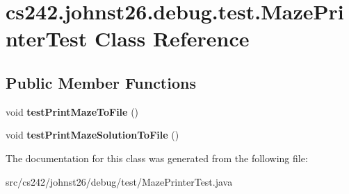 \hypertarget{classcs242_1_1johnst26_1_1debug_1_1test_1_1_maze_printer_test}{\section{cs242.\-johnst26.\-debug.\-test.\-Maze\-Printer\-Test Class Reference}
\label{classcs242_1_1johnst26_1_1debug_1_1test_1_1_maze_printer_test}
}
\subsection*{Public Member Functions}
\begin{DoxyCompactItemize}
\item 
\hypertarget{classcs242_1_1johnst26_1_1debug_1_1test_1_1_maze_printer_test_a6f31e0ef7e7282b110a0682f29760145}{void {\bfseries test\-Print\-Maze\-To\-File} ()}\label{classcs242_1_1johnst26_1_1debug_1_1test_1_1_maze_printer_test_a6f31e0ef7e7282b110a0682f29760145}

\item 
\hypertarget{classcs242_1_1johnst26_1_1debug_1_1test_1_1_maze_printer_test_ab2c01841a5fc1e3f5efdc2d349991944}{void {\bfseries test\-Print\-Maze\-Solution\-To\-File} ()}\label{classcs242_1_1johnst26_1_1debug_1_1test_1_1_maze_printer_test_ab2c01841a5fc1e3f5efdc2d349991944}

\end{DoxyCompactItemize}


The documentation for this class was generated from the following file\-:\begin{DoxyCompactItemize}
\item 
src/cs242/johnst26/debug/test/Maze\-Printer\-Test.\-java\end{DoxyCompactItemize}
